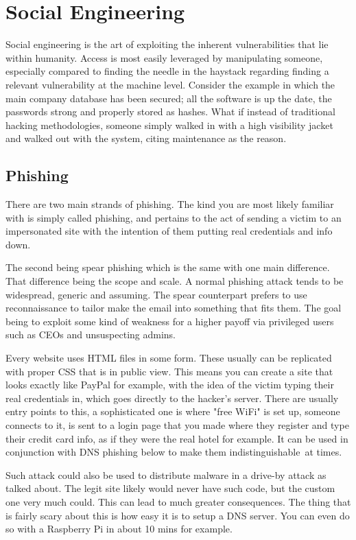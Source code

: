 \section{Social Engineering}
Social engineering is the art of exploiting the inherent vulnerabilities that lie within humanity. Access is most easily leveraged by manipulating someone, especially compared to finding the needle in the haystack regarding finding a relevant vulnerability at the machine level. 
Consider the example in which the main company database has been secured; all the software is up the date, the passwords strong and properly stored as hashes. What if instead of traditional hacking methodologies, someone simply walked in with a high visibility jacket and walked out with the system, 
citing maintenance as the reason. \citep{AssignmentSecurityForensicsPaper}


\subsection{Phishing}
There are two main strands of phishing. The kind you are most likely familiar with is simply called phishing, and pertains to the act of sending a victim to an impersonated site with the intention of them putting real credentials and info down. 

The second being spear phishing which is the same with one main difference. That difference being the scope and scale. A normal phishing attack tends to be widespread, generic and assuming. The spear counterpart prefers to use reconnaissance to tailor make the email into something that fits them. The goal being to exploit some kind of weakness for a higher payoff via privileged users such as CEOs and unsuspecting admins.

Every website uses HTML files in some form. These usually can be replicated with proper CSS that is in public view. This means you can create a site that looks exactly like PayPal for example, with the idea of the victim typing their real credentials in, 
which goes directly to the hacker's server. There are usually entry points to this, a sophisticated one is where "free WiFi" is set up, someone connects to it, is sent to a login page that you made where they register and type their credit card info, 
as if they were the real hotel for example. It can be used in conjunction with DNS phishing below to make them indistinguishable at times.

Such attack could also be used to distribute malware in a drive-by attack as talked about. The legit site likely would never have such code, but the custom one very much could. This can lead to much greater consequences. The thing that is fairly scary about this is how easy it is to setup a DNS server. You can even do so with a Raspberry Pi in about 10 mins for example.

